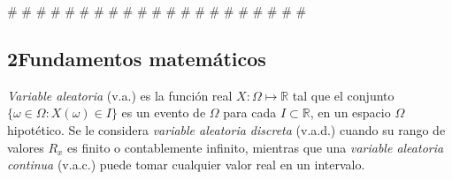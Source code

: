 

\# \# \# \# \# \# \# \# \# \# \# \# \# \# \# \# \# \# \# \# \# \




\subsection {2Fundamentos matemáticos}
\emph{Variable aleatoria} (v.a.) es la función real $X: \Omega\mapsto\mathbb{R}$ tal que el conjunto $\{\omega\in\Omega:X(\omega)\in I\}$ es un evento de $\Omega$ para cada $I\subset\mathbb{R}$, en un espacio $\Omega$ hipotético. Se le considera \emph{variable aleatoria discreta} (v.a.d.) cuando su rango de valores $R_x$ es finito o contablemente infinito, mientras que una \emph{variable aleatoria continua} (v.a.c.) puede tomar cualquier valor real en un intervalo.



